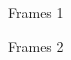 \documentclass[a4paper,12pt]{article}
\begin{document}
\begin{figure}[H]
    \centering
    \begin{adjustbox}{scale = 0.6, max width=\columnwidth}
    \end{adjustbox}
    \caption{Frames 1}
\end{figure}

\begin{figure}[H]
    \centering
    \begin{adjustbox}{scale = 0.6, max width=\columnwidth}
    \end{adjustbox}
    \caption{Frames 2}
\end{figure}
\end{document}
